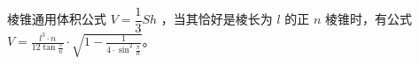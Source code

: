 棱锥通用体积公式 $V=\dfrac{1}{3}Sh$ ，当其恰好是棱长为 $l$ 的正 $n$ 棱锥时，有公式 $\displaystyle V=\frac{l^3\cdot n}{12\tan \frac{\pi}{n}}\cdot\sqrt{1-\frac{1}{4\cdot \sin^2\frac{\pi}{n}}}$。